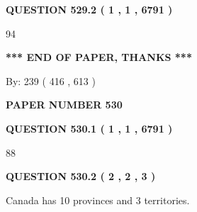 \documentclass[12pt]{article}
\begin{document}
{\textbf{\Large{QUESTION
529.2 
 ( 1 , 1 , 6791 )
}}}
  
  
 
 
\noindent{}

94
 
 
   
   
 \vspace{0.2in}
 
   
   
   
   
\vspace{1.0in} 
{\textbf{\large{ *** END OF PAPER, THANKS *** }}} 
   
   
\hspace{1.0in} By: 
 239 ( 416 ,  613 )
   
   
   
   
\newpage 
\setcounter{page}{ 
   530001 } 
   
   
   
   
 {\textbf{ \Large{ PAPER NUMBER  530  }}}
   
   
\vspace{0.2in}
   
   
   
   
   
   
 \vspace{0.2in}
 
 
 
 
   
   
  
\vspace{0.2in}
  
{\textbf{\Large{QUESTION
530.1 
 ( 1 , 1 , 6791 )
}}}
  
  
 
 
\noindent{}

88
 
 
  
\vspace{0.2in}
  
{\textbf{\Large{QUESTION
530.2 
 ( 2 , 2 , 3 )
}}}
  
  
 
 
\noindent{}
 
 
Canada has 10  provinces and 3 territories.
 
\end{document}
